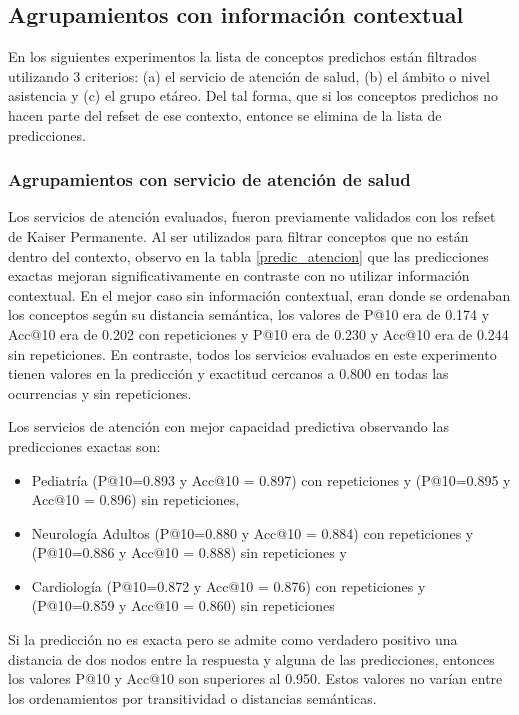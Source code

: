 \subsection{Agrupamientos con información contextual}
En los siguientes experimentos la lista de conceptos predichos están filtrados utilizando 3 criterios: (a) el servicio de atención de salud, (b) el ámbito o nivel asistencia y (c) el grupo etáreo. Del tal forma, que si los conceptos predichos no hacen parte del refset de ese contexto, entonce se elimina de la lista de predicciones.

\subsubsection{Agrupamientos con servicio de atención de salud}

Los servicios de atención evaluados, fueron previamente validados con los refset de Kaiser Permanente. Al ser utilizados para filtrar conceptos que no están dentro del contexto, observo en la tabla \ref{predic_atencion} que las predicciones exactas mejoran significativamente en contraste con no utilizar información contextual. En el mejor caso sin información contextual, eran donde se ordenaban los conceptos según su distancia semántica, los valores de P@10 era de \num{0.174} y Acc@10 era de \num{0.202} con repeticiones y P@10 era de \num{0.230} y Acc@10 era de \num{0.244} sin repeticiones. En contraste, todos los servicios evaluados en este experimento tienen valores en la predicción y exactitud cercanos a \num{0.800} en todas las ocurrencias y sin repeticiones.

Los servicios de atención con mejor capacidad predictiva observando las predicciones exactas son:

\begin{itemize}
\item Pediatría (P@10=\num{0.893} y Acc@10 = \num{0.897}) con repeticiones y (P@10=\num{0.895} y Acc@10 = \num{0.896}) sin repeticiones,
\item Neurología Adultos (P@10=\num{0.880} y Acc@10 = \num{0.884}) con repeticiones y (P@10=\num{0.886} y Acc@10 = \num{0.888}) sin repeticiones y 
\item Cardiología (P@10=\num{0.872} y Acc@10 = \num{0.876}) con repeticiones y (P@10=\num{0.859} y Acc@10 = \num{0.860}) sin repeticiones
\end{itemize}

Si la predicción no es exacta pero se admite como verdadero positivo una distancia de dos nodos entre la respuesta y alguna de las predicciones, entonces los valores P@10 y Acc@10 son superiores al \num{0.950}. Estos valores no varían entre los ordenamientos por transitividad o distancias semánticas.


